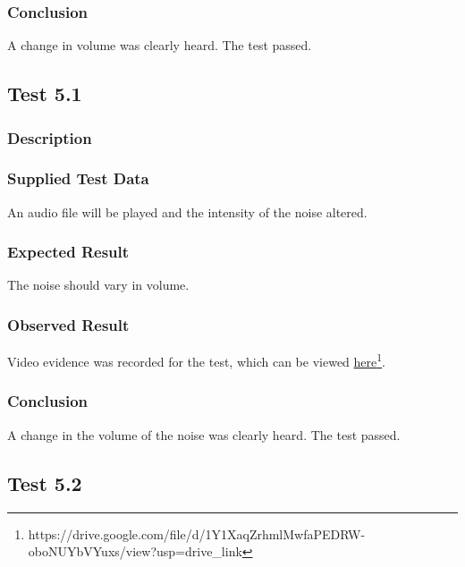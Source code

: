 \subsubsection*{Conclusion}
A change in volume was clearly heard. The test passed.


\pagebreak
\subsection{Test 5.1}
\subsubsection*{Description}
\paragraph{}
{
	\centering
}

\subsubsection*{Supplied Test Data}
An audio file will be played and the intensity of the noise altered.

\subsubsection*{Expected Result}
The noise should vary in volume.

\subsubsection*{Observed Result}
\label{sec:evidence5.1}
Video evidence was recorded for the test, which can be viewed \href{https://drive.google.com/file/d/1Y1XaqZrhmlMwfaPEDRW-oboNUYbVYuxs/view?usp=drive_link}{here}\footnote{
	https://drive.google.com/file/d/1Y1XaqZrhmlMwfaPEDRW-oboNUYbVYuxs/view?usp=drive\_link
}.

\subsubsection*{Conclusion}
A change in the volume of the noise was clearly heard. The test passed.


\pagebreak
\subsection{Test 5.2}
